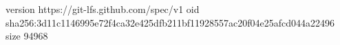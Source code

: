 version https://git-lfs.github.com/spec/v1
oid sha256:3d11c1146995e72f4ca32e425dfb211bf11928557ac20f04e25afcd044a22496
size 94968
